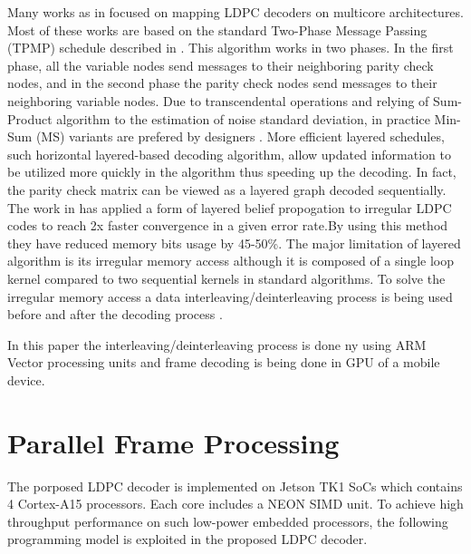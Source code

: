 \documentclass[conference]{IEEEtran}
\begin{document}
Many works as in \cite{art_massively, art_ldpc_cpu0,art_ldpc_OpenCl_1,art_gpu_0} focused on mapping LDPC decoders on multicore architectures. Most of these works are based on the standard Two-Phase Message Passing (TPMP) schedule described in \cite{art_massively}. This algorithm works in two phases. In the first phase, all the variable nodes send messages to their neighboring parity check nodes, and in the second phase the parity check nodes send messages to their neighboring variable nodes. Due to transcendental operations and relying of Sum-Product algorithm to the estimation of noise standard deviation, in practice Min-Sum (MS) variants are prefered by designers \cite{art_neon}. More efficient layered schedules, such horizontal layered-based decoding algorithm, allow updated information to be utilized more quickly in the algorithm thus speeding up the decoding\cite{art_layered0, art_layered1}. In fact, the parity check matrix can be viewed as a layered graph decoded sequentially. The work in \cite{art_gpu_0} has applied a form of layered belief propogation to irregular LDPC codes to reach 2x faster convergence in a given error rate.By using this method they have reduced memory bits usage by 45-50\%. The major limitation of layered algorithm is its irregular memory access although it is composed of a single loop kernel compared to two sequential kernels in standard algorithms. To solve the irregular memory access a data interleaving/deinterleaving process is being used before and after the decoding process \cite{art_gpu_0, art_neon}.

In this paper the interleaving/deinterleaving process is done ny using ARM Vector processing units and frame decoding is being done in GPU of a mobile device.

\section{Parallel Frame Processing}
The porposed LDPC decoder is implemented on Jetson TK1 SoCs which contains 4 Cortex-A15 processors. Each core includes a NEON SIMD unit. To achieve high throughput performance on such low-power embedded processors, the following programming model is exploited in the proposed LDPC decoder.
\end{document}
